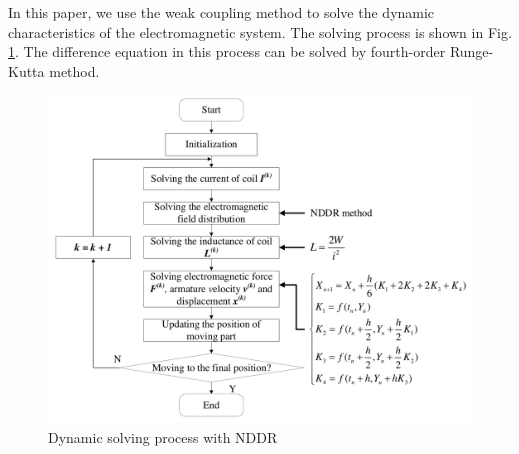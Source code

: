 \documentclass[journal,transmag]{IEEEtran}
\begin{document}
In this paper, we use the weak coupling method to solve the dynamic characteristics of the electromagnetic system. The solving process is shown in Fig. \ref{fig:flowchart}. The difference equation in this process can be solved by fourth-order Runge-Kutta method.
\begin{figure}
	\centering
	\includegraphics[width=1.0\linewidth]{flowchart.pdf}
	\caption{Dynamic solving process with NDDR}
	\label{fig:flowchart}
\end{figure}
\end{document}
